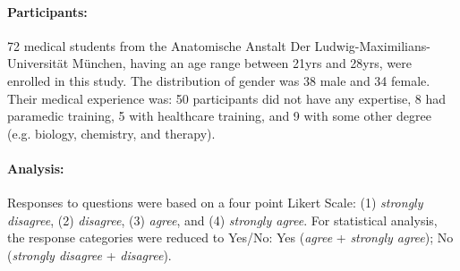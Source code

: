 {{{{{\paragraph{Participants:} 72 medical students from the Anatomische Anstalt Der Ludwig-Maximilians-Universit\"at M\"unchen, having an age range between 21yrs and 28yrs, were enrolled in this study. The distribution of gender was 38 male and 34 female. Their medical experience was: 50 participants did not have any expertise, 8 had paramedic training, 5 with healthcare training, and 9 with some other degree (e.g. biology, chemistry, and therapy). 

\paragraph{Analysis:} Responses to questions were based on a four point Likert Scale: (1) \textit{strongly disagree}, (2) \textit{disagree}, (3) \textit{agree}, and (4) \textit{strongly agree}. For statistical analysis, the response categories were reduced to Yes/No: Yes (\textit{agree} + \textit{strongly agree}); No (\textit{strongly disagree} + \textit{disagree}).

}}}}}
